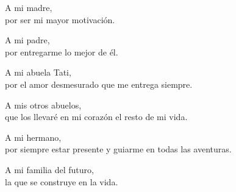 \begin{dedication}

A mi madre,\\
por ser mi mayor motivación.

\vspace{2em}

A mi padre,\\
por entregarme lo mejor de él.

\vspace{2em}

A mi abuela Tati,\\
por el amor desmesurado que me entrega siempre.

\vspace{2em}

A mis otros abuelos,\\
que los llevaré en mi corazón el resto de mi vida.

\vspace{2em}

A mi hermano,\\
por siempre estar presente y guiarme en todas las aventuras.

\vspace{2em}

A mi familia del futuro,\\
la que se construye en la vida.

\end{dedication}